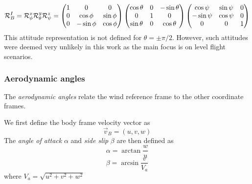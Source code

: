 \begin{equation}\label{eq:r_i_b}
\mathcal{R}^I_B = \mathcal{R}^x_\phi\mathcal{R}^y_\theta\mathcal{R}^z_\psi\\
=
\begin{pmatrix}
    1 & 0 & 0 \\
    0 & \cos\phi & \sin\phi \\
    0 & -\sin\phi & \cos\phi
\end{pmatrix}
\begin{pmatrix}
    \cos\theta & 0 & -\sin\theta \\
    0 & 1 & 0 \\
    \sin\theta & 0 & \cos\theta
\end{pmatrix}      
\begin{pmatrix}
    \cos\psi & \sin\psi & 0 \\
    -\sin\psi & \cos\psi & 0 \\
    0 & 0 & 1
\end{pmatrix}
\end{equation}  
This attitude representation is not defined for $\theta=\pm\pi/2$. However, such attitudes
 were deemed very unlikely in this work as the main focus is on level flight scenarios.

\subsubsection{Aerodynamic angles}
The \textit{aerodynamic angles} relate the wind reference frame to the other coordinate frames.

\begin{definition}
We first define the body frame velocity vector as 
\begin{equation}
    \vec{v}_B=(u, v, w)
\end{equation}
The \textit{angle of attack} $\alpha$ and \textit{side slip} $\beta$ are then defined as
\begin{equation}
    \alpha=\arctan\frac{w}{u}
\end{equation}
\begin{equation}
    \beta=\arcsin\frac{v}{V_a}
\end{equation}
where $V_a=\sqrt{u^2+v^2+w^2}$
\end{definition}

